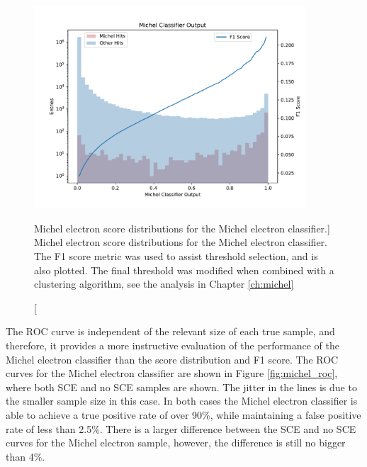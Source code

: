 \begin{figure}
	\centering
	\includegraphics[width=0.9\textwidth]{figures/michel_combined.pdf} 
	\caption
	[Michel electron score distributions for the Michel electron classifier.]
	{Michel electron score distributions for the Michel electron classifier. 
	The F1 score metric was used to assist threshold selection, and is also
	plotted. The final threshold was modified when combined with a clustering
	algorithm, see the analysis in Chapter \ref{ch:michel}}
	\label{fig:michel_output}
\end{figure}

The ROC curve is independent of the relevant size of each true sample, and
therefore, it provides a more instructive evaluation of the performance of the
Michel electron classifier than the score distribution and F1 score. The ROC 
curves for the Michel electron classifier are shown in Figure 
\ref{fig:michel_roc}, where both SCE and no SCE samples are shown. The jitter 
in the lines is due to the smaller sample size in this case. In both cases the 
Michel electron classifier is able to achieve a true positive rate of over 90\%,
while maintaining a false positive rate of less than 2.5\%. There is a larger 
difference between the SCE and no SCE curves for the Michel electron sample,
however, the difference is still no bigger than 4\%.

